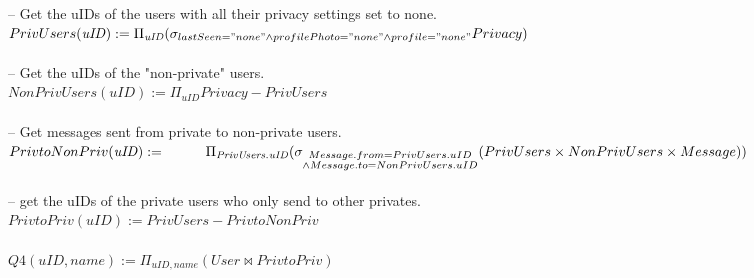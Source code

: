 \documentclass{article}
\newcommand{\var}[1]{\mathit{#1}}
\begin{document}
\begin{enumerate}
{\large
\hspace*{1cm} -- Get the uIDs of the users with all their privacy settings set to none. \\ [5pt]
$
PrivUsers(\var{uID}) := 
	\Pi_{\var{uID}}
	(\sigma_{lastSeen = "none" \\
			\wedge profilePhoto = "none" \\
			\wedge profile = "none"} Privacy)
$ \\\\
\hspace*{1cm} -- Get the uIDs of the "non-private" users. \\ [5pt]
$
NonPrivUsers(\var{uID}) :=
	\Pi_{\var{uID}} Privacy - PrivUsers
$ \\\\
\hspace*{1cm} -- Get messages sent from private to non-private users.	 \\ [5pt]
$
PrivtoNonPriv(\var{uID}) := \\
	\hspace*{1cm}
	\Pi_{\var{PrivUsers.uID}}
	(\sigma_{\substack{Message.from = PrivUsers.uID \\
		 \wedge Message.to = NonPrivUsers.uID}}
		(PrivUsers \times NonPrivUsers \times Message))	
$ \\	\\
\hspace*{1cm} -- get the uIDs of the private users who only send to other privates. \\ [5pt]
$
PrivtoPriv(\var{uID}) :=
	PrivUsers - PrivtoNonPriv
$ \\\\
$
Q4(\var{uID}, name) :=
	\Pi_{\var{uID}, \var{name}} (User \bowtie PrivtoPriv)
$


}


\end{enumerate}
\end{document}
